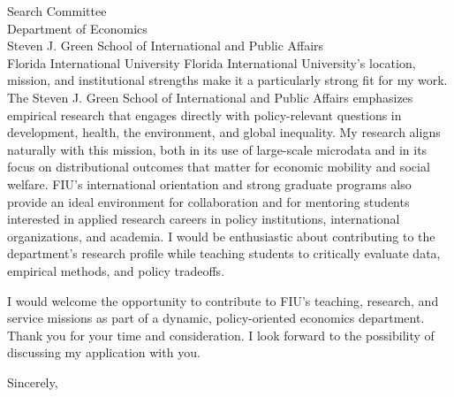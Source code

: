 \documentclass[11pt,letterpaper]{letter}
\begin{document}
\begin{letter}{Search Committee \\
Department of Economics \\
Steven J. Green School of International and Public Affairs \\
Florida International University}
Florida International University’s location, mission, and institutional strengths make it a particularly strong fit for my work. The Steven J. Green School of International and Public Affairs emphasizes empirical research that engages directly with policy-relevant questions in development, health, the environment, and global inequality. My research aligns naturally with this mission, both in its use of large-scale microdata and in its focus on distributional outcomes that matter for economic mobility and social welfare. FIU’s international orientation and strong graduate programs also provide an ideal environment for collaboration and for mentoring students interested in applied research careers in policy institutions, international organizations, and academia. I would be enthusiastic about contributing to the department’s research profile while teaching students to critically evaluate data, empirical methods, and policy tradeoffs.

I would welcome the opportunity to contribute to FIU’s teaching, research, and service missions as part of a dynamic, policy-oriented economics department. Thank you for your time and consideration. I look forward to the possibility of discussing my application with you.

\closing{Sincerely,}

\end{letter}
\end{document}
